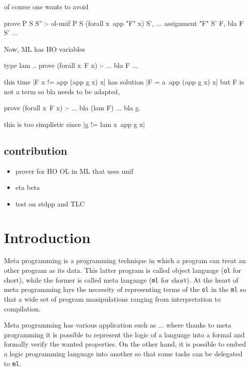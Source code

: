 \documentclass[acmengage]{acmart}
\newcommand*{\acronym}[1]{\texttt{#1}\xspace}
\def\ol{\acronym{ol}} %
\def\ml{\acronym{ml}} %
\begin{document}
of course one wants to avoid
\begin{elpicode}
prove P S S'' :- ol-unif P S (forall x\ app "F" x) S', ... assignment "F" S' F, bla F S' ...
\end{elpicode}

Now, ML has HO variables
\begin{elpicode}
type lam ..
prove (forall x\ F x) :- ... bla F ...
\end{elpicode}
this time  |F x != app (app g x) x| has solution
|F = a\ app (app g x) x| but F is not a term so
bla needs to be adapted,
\begin{elpicode}
prove (forall x\ F x) :- ... bla (lam F) ...
bla g.
\end{elpicode}
this is too simplistic since |g != lam x\ app g x|

\subsection{contribution}
\begin{itemize}
\item prover for HO OL in ML that uses unif
\item eta beta
\item test on stdpp and TLC
\end{itemize}


\section{Introduction}

Meta programming \cite{hill1994} is a programming technique in which a program
can treat an other program as its data. This latter program is called object
language (\ol for short), while the former is called meta language (\ml for
short). At the heart of meta programming lays the necessity of representing
terms of the \ol in the \ml so that a wide set of program
manipulations ranging from interpretation to compilation. 

Meta programming has various application such as ... where thanks to meta
programming it is possible to represent the logic of a language into a formal
and formally verify the wanted properties. On the other hand, it is possible to
embed a logic programming language into another so that some tasks can be
delegated to \ml.
\end{document}
